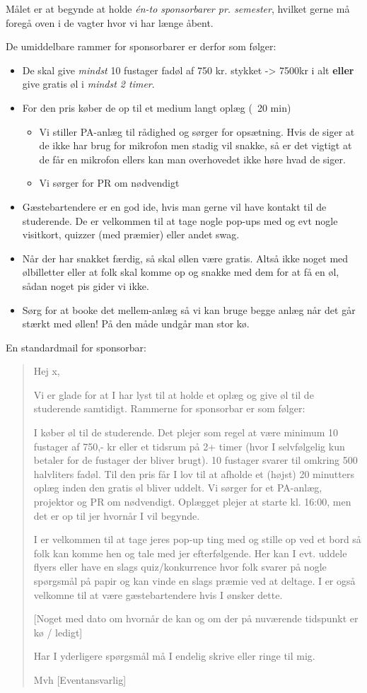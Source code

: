 Målet er at begynde at holde \emph{én-to sponsorbarer pr. semester},
hvilket gerne må foregå oven i de vagter hvor vi har længe åbent.

De umiddelbare rammer for sponsorbarer er derfor som følger:
\begin{itemize}
\item De skal give \textit{mindst} 10 fustager fadøl af 750 kr. stykket -> 7500kr i
  alt \textbf{eller} give gratis øl i \textit{mindst 2 timer}.
\item For den pris køber de op til et medium langt oplæg (~20 min)
  \begin{itemize}
  \item Vi stiller PA-anlæg til rådighed og sørger for opsætning. Hvis de siger at de ikke har brug for mikrofon men stadig vil snakke, så er det vigtigt at de får en mikrofon ellers kan man overhovedet ikke høre hvad de siger.
  \item Vi sørger for PR om nødvendigt
  \end{itemize}
\item Gæstebartendere er en god ide, hvis man gerne vil have kontakt
  til de studerende. De er velkommen til at tage nogle pop-ups med og evt nogle visitkort, quizzer (med præmier) eller andet swag.
\item Når der har snakket færdig, så skal øllen være gratis. Altså ikke noget med ølbilletter eller at folk skal komme op og snakke med dem for at få en øl, sådan noget pis gider vi ikke.
\item Sørg for at booke det mellem-anlæg så vi kan bruge begge anlæg når det går stærkt med øllen! På den måde undgår man stor kø.
\end{itemize}


En standardmail for sponsorbar:
\begin{quote}
Hej x,

Vi er glade for at I har lyst til at holde et oplæg og give øl til de studerende samtidigt. Rammerne for sponsorbar er som følger:

I køber øl til de studerende. Det plejer som regel at være minimum 10 fustager af 750,- kr eller et tidsrum på 2+ timer (hvor I selvfølgelig kun betaler for de fustager der bliver brugt). 10 fustager svarer til omkring 500 halvliters fadøl. Til den pris får I lov til at afholde et (højst) 20 minutters oplæg inden den gratis øl bliver uddelt. Vi sørger for et PA-anlæg, projektor og PR om nødvendigt. Oplægget plejer at starte kl. 16:00, men det er op til jer hvornår I vil begynde.

I er velkommen til at tage jeres pop-up ting med og stille op ved et bord så folk kan komme hen og tale med jer efterfølgende. Her kan I evt. uddele flyers eller have en slags quiz/konkurrence hvor folk svarer på nogle spørgsmål på papir og kan vinde en slags præmie ved at deltage. I er også velkomne til at være gæstebartendere hvis I ønsker dette.


[Noget med dato om hvornår de kan og om der på nuværende tidspunkt er kø / ledigt]
 

Har I yderligere spørgsmål må I endelig skrive eller ringe til mig.

Mvh [Eventansvarlig]
\end{quote}

